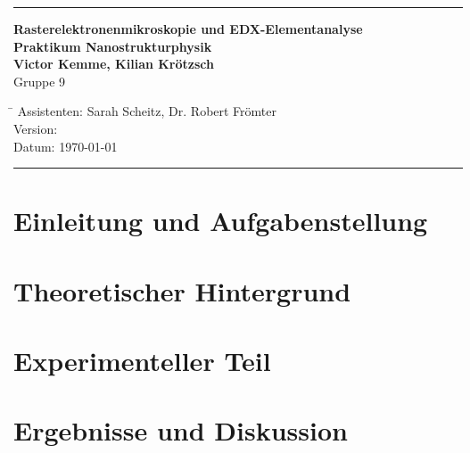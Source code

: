 \documentclass[
	a4paper,										%
	12pt,											%
	twoside,										%
	headsepline,								%
	footsepline,									%
	captions=tableheading,					%
]{scrartcl}
\begin{document}
\thispagestyle{empty}
	
\begin{titlepage}
	\begin{center}
		\hrule													%
		\vspace*{\fill}
		\Huge {\textbf {Rasterelektronenmikroskopie und EDX-Elementanalyse}}\\
		\vspace*{1cm}
		\normalsize {\textbf {Praktikum Nanostrukturphysik}}\\
		\vspace*{1cm}
		\large {\textbf{Victor Kemme, Kilian Krötzsch}}\\
		\normalsize{Gruppe 9}								%
		\vfill
	\end{center}
	\begin{tabbing}
		\hspace{3cm}\=\kill
		Assistenten: \> Sarah Scheitz, Dr. Robert Frömter \\						%
		Version: \\										%
		Datum: \> \today \\								%
	\end{tabbing}
	\hrule														%
\end{titlepage}
\setcounter{section}{0}								%
\setcounter{subsection}{0}							%
\normalsize
\setcounter{page}{1}

\section{Einleitung und Aufgabenstellung}

\section{Theoretischer Hintergrund}

\section{Experimenteller Teil}

\section{Ergebnisse und Diskussion}
\end{document}
